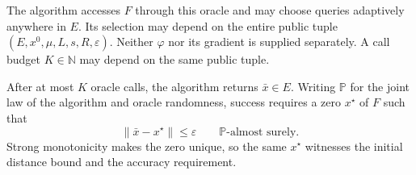 \documentclass[10pt]{article}
\theoremstyle{definition}
\begin{document}
The algorithm accesses $F$ through this oracle and may choose queries adaptively anywhere in $E$. Its selection may depend on the entire public tuple $(E,x^0,\mu,L,s,R,\varepsilon)$. Neither $\varphi$ nor its gradient is supplied separately. A call budget $K\in\mathbb{N}$ may depend on the same public tuple.

After at most $K$ oracle calls, the algorithm returns $\bar{x}\in E$. Writing $\mathbb{P}$ for the joint law of the algorithm and oracle randomness, success requires a zero $x^\star$ of $F$ such that
\[
\|\bar{x}-x^\star\|\leq\varepsilon
\qquad \mathbb{P}\text{-almost surely}.
\]
Strong monotonicity makes the zero unique, so the same $x^\star$ witnesses the initial distance bound and the accuracy requirement.
\end{document}
